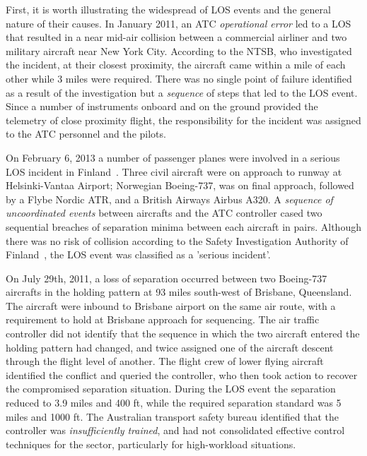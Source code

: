 \documentclass[letter,onecolumn,12pt]{aiaa-tc}
\newcommand{\1}{1_n}
\begin{document}
First, it is worth illustrating the widespread of LOS events and the general nature of their causes. In January 2011, an ATC \emph{operational error} led to a LOS that resulted in a near mid-air collision  between a commercial airliner and two military aircraft near New York City. According to the NTSB\cite{OIG_AR2013}, who investigated the incident, at their closest proximity, the aircraft came within a mile of each other while 3 miles were required. There was no single point of failure identified as a result of the investigation but a \emph{sequence} of steps that led to the LOS event. Since a number of instruments onboard and on the ground provided the telemetry of close proximity flight, the responsibility for the incident was assigned to the ATC personnel and the pilots.

On February 6, 2013  a number of  passenger planes were involved in a serious LOS incident in Finland~\cite{Vantaa_IR2013}.  Three civil aircraft were on approach to runway at Helsinki-Vantaa Airport; Norwegian Boeing-737, was on final approach, followed by a Flybe Nordic ATR, and a British Airways Airbus A320. A \emph{sequence of uncoordinated events} between aircrafts and the ATC controller cased two sequential breaches of separation minima between each aircraft in pairs. Although there was no risk of collision according to the Safety Investigation Authority of Finland~\cite{Vantaa_IR2013}, the LOS event was classified as a 'serious incident'.

On July 29th, 2011, a loss of separation occurred between two Boeing-737 aircrafts in the holding pattern at 93 miles south-west of Brisbane, Queensland\cite{Brisbane_ATSR2011}. The aircraft were inbound to Brisbane airport on the same air route, with a requirement to hold at Brisbane approach for sequencing. The air traffic controller did not identify that the sequence in which the two aircraft entered the holding pattern had changed, and twice assigned one of the aircraft descent through the flight level of another. The flight crew of lower flying aircraft identified the conflict and queried the controller, who then took action to recover the compromised separation situation. During the LOS event the separation reduced to 3.9 miles and 400 ft, while the required separation standard was 5 miles and 1000 ft. The Australian transport safety bureau identified that the controller was \emph{insufficiently trained}, and had not consolidated effective control techniques for the sector, particularly for high-workload situations.
\end{document}
